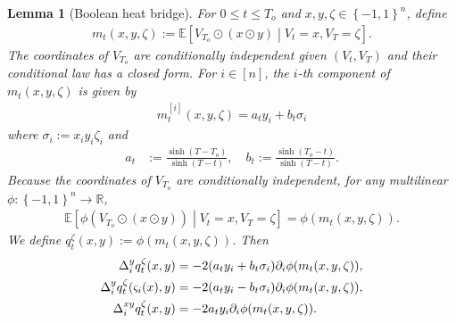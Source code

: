 \documentclass[10pt,a4paper]{amsart}
\newtheorem{lemma}{Lemma}
\newcommand{\Exs}{\ensuremath{{\mathbb{E}}}}
\newcommand{\To}{{T_o}}
\newcommand{\braces}[1]{\left\{ #1 \right \}}
\newcommand{\brackets}[1]{\left[ #1 \right]}
\newcommand{\defn}{:=}
\newcommand{\flip}{\varsigma}
\newcommand{\real}{\ensuremath{\mathbb{R}}}
\newcommand{\uV}{V}
\begin{document}
\begin{lemma}[Boolean heat bridge]
  \label{lem:boolean_bridge_formula}
  For $0 \leq t \leq \To$ and $x, y, \zeta \in \braces{-1,1}^n$, define
\begin{align}
  \label{eq:def_m}
  m_{t}(x, y, \zeta) \defn \Exs\brackets{\uV_{\To} \odot (x \odot y) \middle| \uV_t = x, \uV_{T} = \zeta}.
\end{align}
The coordinates of $\uV_{\To}$ are conditionally independent given $(\uV_t, \uV_{T})$ and their conditional law has a closed form. For $i \in [n]$, the $i$-th component of $m_{t}(x, y, \zeta)$ is given by  
  \begin{align*}
     m_{t}^{[i]}(x, y, \zeta) = a_{t} y_i + b_{t} \sigma_i
  \end{align*}
  where $\sigma_i \defn x_i y_i \zeta_i$ and
  \begin{align}
    \label{eq:def_a_b}
    a_{t} &\defn \frac{\sinh(T-\To)}{\sinh(T-t)}, \quad b_{t} \defn \frac{\sinh(\To-t)}{\sinh(T-t)}.
  \end{align}
  Because the coordinates of $\uV_{\To}$ are conditionally independent, for any multilinear $\phi:\braces{-1,1}^n \to \real$,
  \begin{align*}
    \Exs\brackets{\phi(\uV_\To \odot (x \odot y))  \middle| \uV_t = x, \uV_T = \zeta} = \phi(m_{t}(x, y, \zeta)).
  \end{align*}
  We define $q_t^{\zeta}(x, y) \defn \phi(m_{t}(x, y, \zeta))$. Then
  \begin{align}
    \label{eq:q_t_derivative}
    \Delta_i^y q_t^{\zeta}(x, y) &= -2 (a_t y_i + b_t \sigma_i) \partial_i \phi(m_{t}(x, y, \zeta)), \notag \\
    \Delta_i^y q_t^{\zeta}(\flip_i(x), y) &= -2 (a_t y_i - b_t \sigma_i) \partial_i \phi(m_{t}(x, y, \zeta)), \notag \\
    \Delta_{i}^{xy} q_t^{\zeta}(x, y) &= -2 a_t y_i \partial_i \phi(m_{t}(x, y, \zeta)).
  \end{align}
\end{lemma}
\end{document}
